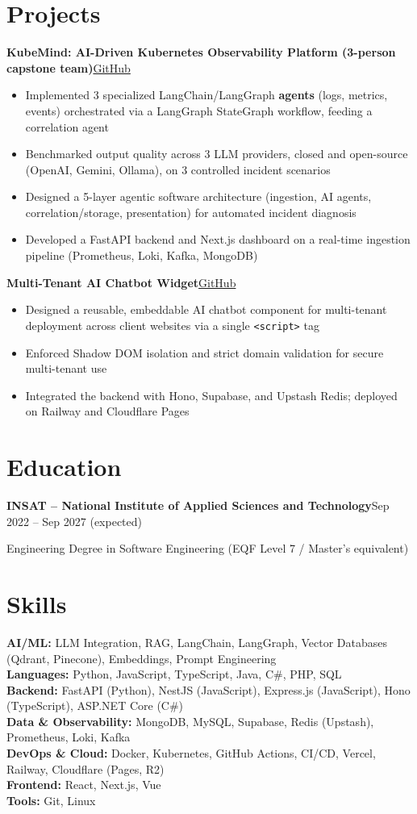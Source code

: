 \documentclass[10pt,a4paper]{article}
\newcommand{\entry}[2]{\vspace{1pt}\noindent\textbf{#1}\hfill{\color{muted}#2}\par}
\newcommand{\gh}[1]{\href{https://github.com/Hsan003/#1}{GitHub}}
\begin{document}
\section{Projects}
\entry{KubeMind: AI-Driven Kubernetes Observability Platform (3-person capstone team)}{\gh{kubemind}}
\begin{itemize}
  \item Implemented 3 specialized LangChain/LangGraph \textbf{agents} (logs, metrics, events) orchestrated via a LangGraph StateGraph workflow, feeding a correlation agent
  \item Benchmarked output quality across 3 LLM providers, closed and open-source (OpenAI, Gemini, Ollama), on 3 controlled incident scenarios
  \item Designed a 5-layer agentic software architecture (ingestion, AI agents, correlation/storage, presentation) for automated incident diagnosis
  \item Developed a FastAPI backend and Next.js dashboard on a real-time ingestion pipeline (Prometheus, Loki, Kafka, MongoDB)
\end{itemize}
\entry{Multi-Tenant AI Chatbot Widget}{\gh{AI-Assistant-Backend}}
\begin{itemize}
  \item Designed a reusable, embeddable AI chatbot component for multi-tenant deployment across client websites via a single \texttt{<script>} tag
  \item Enforced Shadow DOM isolation and strict domain validation for secure multi-tenant use
  \item Integrated the backend with Hono, Supabase, and Upstash Redis; deployed on Railway and Cloudflare Pages
\end{itemize}

\section{Education}
\entry{INSAT -- National Institute of Applied Sciences and Technology}{Sep 2022 -- Sep 2027 (expected)}
Engineering Degree in Software Engineering (EQF Level 7 / Master's equivalent)

\section{Skills}
\textbf{AI/ML:} LLM Integration, RAG, LangChain, LangGraph, Vector Databases (Qdrant, Pinecone), Embeddings, Prompt Engineering\\
\textbf{Languages:} Python, JavaScript, TypeScript, Java, C\#, PHP, SQL\\
\textbf{Backend:} FastAPI (Python), NestJS (JavaScript), Express.js (JavaScript), Hono (TypeScript), ASP.NET Core (C\#)\\
\textbf{Data \& Observability:} MongoDB, MySQL, Supabase, Redis (Upstash), Prometheus, Loki, Kafka\\
\textbf{DevOps \& Cloud:} Docker, Kubernetes, GitHub Actions, CI/CD, Vercel, Railway, Cloudflare (Pages, R2)\\
\textbf{Frontend:} React, Next.js, Vue\\
\textbf{Tools:} Git, Linux
\end{document}
